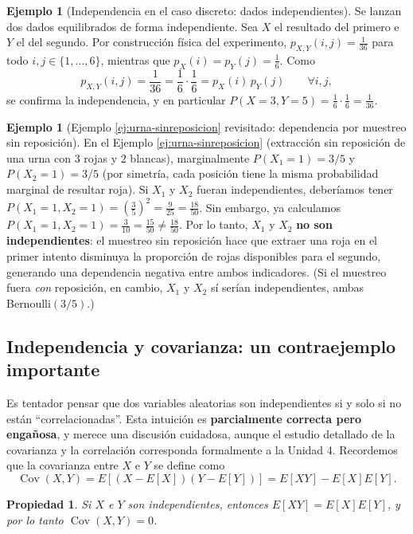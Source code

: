 \documentclass[11pt,a4paper]{article}
\theoremstyle{plain}
\newtheorem{propiedad}[teorema]{Propiedad}
\theoremstyle{definition}
\newtheorem{ejemplo}[teorema]{Ejemplo}
\theoremstyle{remark}
\begin{document}
\begin{ejemplo}[Independencia en el caso discreto: dados independientes]
Se lanzan dos dados equilibrados de forma independiente. Sea $X$ el resultado del primero e $Y$ el del segundo. Por construcción física del experimento, $p_{X,Y}(i,j) = \tfrac{1}{36}$ para todo $i,j\in\{1,\dots,6\}$, mientras que $p_X(i)=p_Y(j)=\tfrac16$. Como
\[
p_{X,Y}(i,j) = \frac{1}{36} = \frac16\cdot\frac16 = p_X(i)\,p_Y(j) \qquad \forall i,j,
\]
se confirma la independencia, y en particular $P(X=3,Y=5)=\tfrac16\cdot\tfrac16=\tfrac{1}{36}$.
\end{ejemplo}

\begin{ejemplo}[Ejemplo \ref{ej:urna-sinreposicion} revisitado: dependencia por muestreo sin reposición]
En el Ejemplo \ref{ej:urna-sinreposicion} (extracción sin reposición de una urna con $3$ rojas y $2$ blancas), marginalmente $P(X_1=1)=3/5$ y $P(X_2=1)=3/5$ (por simetría, cada posición tiene la misma probabilidad marginal de resultar roja). Si $X_1$ y $X_2$ fueran independientes, deberíamos tener $P(X_1=1,X_2=1)=\left(\tfrac35\right)^2=\tfrac{9}{25}=\tfrac{18}{50}$. Sin embargo, ya calculamos $P(X_1=1,X_2=1)=\tfrac{3}{10}=\tfrac{15}{50}\ne\tfrac{18}{50}$. Por lo tanto, $X_1$ y $X_2$ \textbf{no son independientes}: el muestreo sin reposición hace que extraer una roja en el primer intento disminuya la proporción de rojas disponibles para el segundo, generando una dependencia negativa entre ambos indicadores. (Si el muestreo fuera \emph{con} reposición, en cambio, $X_1$ y $X_2$ sí serían independientes, ambas Bernoulli$(3/5)$.)
\end{ejemplo}

\subsection{Independencia y covarianza: un contraejemplo importante}\label{sec:contraejemplo}

Es tentador pensar que dos variables aleatorias son independientes si y solo si no están ``correlacionadas''. Esta intuición es \textbf{parcialmente correcta pero engañosa}, y merece una discusión cuidadosa, aunque el estudio detallado de la covarianza y la correlación corresponda formalmente a la Unidad 4. Recordemos que la covarianza entre $X$ e $Y$ se define como
\[
\operatorname{Cov}(X,Y) = E[(X-E[X])(Y-E[Y])] = E[XY]-E[X]E[Y].
\]

\begin{propiedad}
Si $X$ e $Y$ son independientes, entonces $E[XY]=E[X]E[Y]$, y por lo tanto $\operatorname{Cov}(X,Y)=0$.
\end{propiedad}
\end{document}
